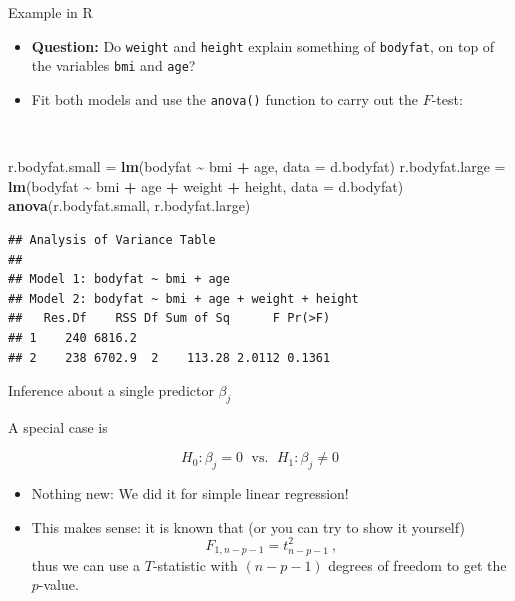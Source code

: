 \documentclass[
  10pt,
  ignorenonframetext,
]{beamer}
\newenvironment{Shaded}{\begin{snugshade}}{\end{snugshade}}
\newcommand{\AttributeTok}[1]{\textcolor[rgb]{0.13,0.29,0.53}{#1}}
\newcommand{\FunctionTok}[1]{\textcolor[rgb]{0.13,0.29,0.53}{\textbf{#1}}}
\newcommand{\NormalTok}[1]{#1}
\newcommand{\OtherTok}[1]{\textcolor[rgb]{0.56,0.35,0.01}{#1}}
\newcommand{\SpecialCharTok}[1]{\textcolor[rgb]{0.81,0.36,0.00}{\textbf{#1}}}
\begin{document}
\begin{frame}[fragile]
\begin{block}{Example in R}
\protect\hypertarget{example-in-r}{}
\vspace{3mm}

\begin{itemize}
\item
  \textbf{Question:} Do \texttt{weight} and \texttt{height} explain
  something of \texttt{bodyfat}, on top of the variables \texttt{bmi}
  and \texttt{age}?
\item
  Fit both models and use the \texttt{anova()} function to carry out the
  \(F\)-test:
\end{itemize}

\(~\)

\footnotesize

\begin{Shaded}
\begin{Highlighting}[]
\NormalTok{r.bodyfat.small }\OtherTok{=} \FunctionTok{lm}\NormalTok{(bodyfat }\SpecialCharTok{\textasciitilde{}}\NormalTok{ bmi }\SpecialCharTok{+}\NormalTok{ age, }\AttributeTok{data =}\NormalTok{ d.bodyfat)}
\NormalTok{r.bodyfat.large }\OtherTok{=} \FunctionTok{lm}\NormalTok{(bodyfat }\SpecialCharTok{\textasciitilde{}}\NormalTok{ bmi }\SpecialCharTok{+}\NormalTok{ age }\SpecialCharTok{+}\NormalTok{ weight }\SpecialCharTok{+}\NormalTok{ height, }\AttributeTok{data =}\NormalTok{ d.bodyfat)}
\FunctionTok{anova}\NormalTok{(r.bodyfat.small, r.bodyfat.large)}
\end{Highlighting}
\end{Shaded}

\begin{verbatim}
## Analysis of Variance Table
## 
## Model 1: bodyfat ~ bmi + age
## Model 2: bodyfat ~ bmi + age + weight + height
##   Res.Df    RSS Df Sum of Sq      F Pr(>F)
## 1    240 6816.2                           
## 2    238 6702.9  2    113.28 2.0112 0.1361
\end{verbatim}

\normalsize
\end{block}
\end{frame}

\begin{frame}
\begin{block}{Inference about a single predictor \(\beta_j\)}
\protect\hypertarget{inference-about-a-single-predictor-beta_j}{}
\(~\)

A special case is

\[H_0: \beta_j=0 \; \text{ vs. } \; H_1: \beta_j\neq 0\] \vspace{2mm}

\begin{itemize}
\item
  Nothing new: We did it for simple linear regression!
\item
  This makes sense: it is known that (or you can try to show it
  yourself) \[F_{1,n-p-1} = t^2_{n-p-1} \ ,\] thus we can use a
  \(T\)-statistic with \((n-p-1)\) degrees of freedom to get the
  \(p\)-value.
\end{itemize}
\end{block}
\end{frame}
\end{document}
